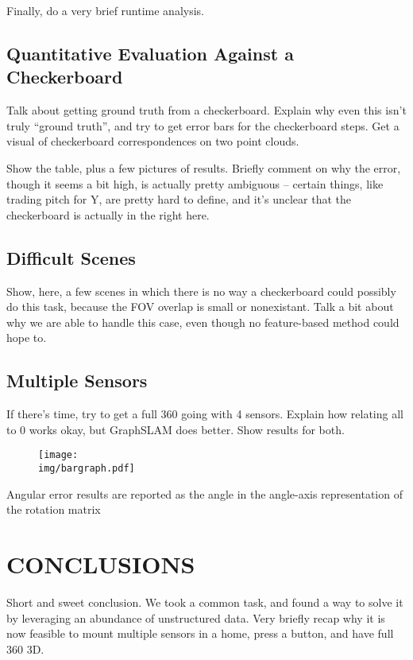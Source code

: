 \documentclass[letterpaper, 10 pt, conference]{ieeeconf}  %
\newcommand{\img}{img}
\begin{document}
Finally, do a very brief runtime analysis.

\subsection{Quantitative Evaluation Against a Checkerboard}

Talk about getting ground truth from a checkerboard. Explain why even this isn't truly ``ground truth'', and try to get error bars 
for the checkerboard steps. Get a visual of checkerboard correspondences on two point clouds.

Show the table, plus a few pictures of results. Briefly comment on why the error, though it seems a bit high, is actually pretty ambiguous -- certain things, like trading pitch for Y, are pretty hard to define, and it's unclear that the checkerboard is actually in the 
right here. 

\subsection{Difficult Scenes}

Show, here, a few scenes in which there is no way a checkerboard could possibly do this task, because the FOV overlap is small or 
nonexistant. Talk a bit about why we are able to handle this case, even though no feature-based method could hope to.

\subsection{Multiple Sensors}

If there's time, try to get a full 360 going with 4 sensors. Explain how relating all to 0 works okay, but GraphSLAM does better. Show 
results for both.

\begin{figure}
  \centering
  \texttt{[image: \\img/bargraph.pdf]}
  \caption{}
  \label{fig:bargraph}
\end{figure}

\begin{figure}
  \centering
  
  \label{fig:results}
\end{figure}

Angular error results are reported as the angle in the angle-axis representation of the rotation matrix 

\section{CONCLUSIONS}

Short and sweet conclusion. We took a common task, and found a way to solve it by leveraging an abundance of unstructured 
data. Very briefly recap why it is now feasible to mount multiple sensors in a home, press a button, and have full 360 3D.



\end{document}
